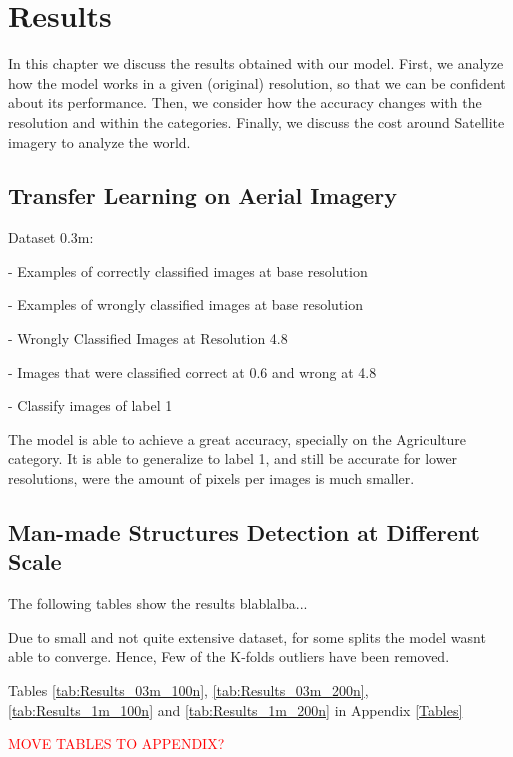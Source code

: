 
\chapter{Results} 

\label{Chapter5}


In this chapter we discuss the results obtained with our model. First, we analyze how the model works in a given (original) resolution, so that we can be confident about its performance. Then, we consider how the accuracy changes with the resolution and within the categories. Finally, we discuss the cost around Satellite imagery to analyze the world. 

\section{Transfer Learning on Aerial Imagery}

Dataset 0.3m:

- Examples of correctly classified images at base resolution

- Examples of wrongly classified images at base resolution

- Wrongly Classified Images at Resolution 4.8

- Images that were classified correct at 0.6 and wrong at 4.8

- Classify images of label 1

The model is able to achieve a great accuracy, specially on the Agriculture category. It is able to generalize to label 1, and still be accurate for lower resolutions, were the amount of pixels per images is much smaller.

\section{Man-made Structures Detection at Different Scale}

The following tables show the results blablalba...

Due to small and not quite extensive dataset, for some splits the model wasnt able to converge. Hence, Few of the K-folds outliers have been removed.

Tables \ref{tab:Results_03m_100n}, \ref{tab:Results_03m_200n}, \ref{tab:Results_1m_100n} and \ref{tab:Results_1m_200n} in Appendix \ref{Tables}

\textcolor{red}{MOVE TABLES TO APPENDIX?}



